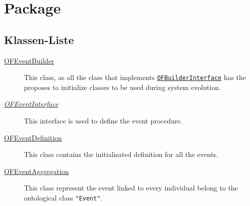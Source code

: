 
\chapter[Package ontologyFramework.OFEventManagement.OFLogicalEventManagement]{Package }\label{ontologyFramework.OFEventManagement.OFLogicalEventManagement-package}



\section{Klassen-Liste}
\begin{description}
\item[{\hyperlink{ontologyFramework.OFEventManagement.OFLogicalEventManagement.OFEventBuilder-class}{OFEventBuilder}}]
This class, as all the class that implements \texttt{\hyperlink{ontologyFramework.OFRunning.OFInitialising.OFBuilderInterface<T>-class}{OFBuilderInterface}} has the proposes to initialize
 classes to be used during system evolution.
\hfill\pageref{ontologyFramework.OFEventManagement.OFLogicalEventManagement.OFEventBuilder-class}

\item[{\textit{\hyperlink{ontologyFramework.OFEventManagement.OFLogicalEventManagement.OFEventInterface-class}{OFEventInterface}}}]
This interface is used to define the event procedure.
\hfill\pageref{ontologyFramework.OFEventManagement.OFLogicalEventManagement.OFEventInterface-class}

\item[{\hyperlink{ontologyFramework.OFEventManagement.OFLogicalEventManagement.OFEventDefinition-class}{OFEventDefinition}}]
This class contains the initialisated definition for all the events.
\hfill\pageref{ontologyFramework.OFEventManagement.OFLogicalEventManagement.OFEventDefinition-class}

\item[{\hyperlink{ontologyFramework.OFEventManagement.OFLogicalEventManagement.OFEventAggregation-class}{OFEventAggregation}}]
This class represent the event linked to every individual belong to the ontological class \verb!"Event"!.
\hfill\pageref{ontologyFramework.OFEventManagement.OFLogicalEventManagement.OFEventAggregation-class}

\end{description}
